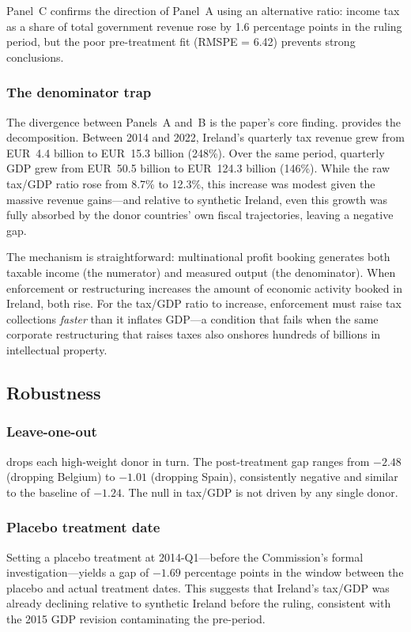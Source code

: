 \documentclass[12pt]{article}
\begin{document}
Panel~C confirms the direction of Panel~A using an alternative ratio: income tax as a share of total government revenue rose by 1.6 percentage points in the ruling period, but the poor pre-treatment fit (RMSPE = 6.42) prevents strong conclusions.

\subsubsection*{The denominator trap} The divergence between Panels~A and~B is the paper's core finding.  provides the decomposition. Between 2014 and 2022, Ireland's quarterly tax revenue grew from EUR~4.4 billion to EUR~15.3 billion (248\%). Over the same period, quarterly GDP grew from EUR~50.5 billion to EUR~124.3 billion (146\%). While the raw tax/GDP ratio rose from 8.7\% to 12.3\%, this increase was modest given the massive revenue gains---and relative to synthetic Ireland, even this growth was fully absorbed by the donor countries' own fiscal trajectories, leaving a negative gap.



The mechanism is straightforward: multinational profit booking generates both taxable income (the numerator) and measured output (the denominator). When enforcement or restructuring increases the amount of economic activity booked in Ireland, both rise. For the tax/GDP ratio to increase, enforcement must raise tax collections \textit{faster} than it inflates GDP---a condition that fails when the same corporate restructuring that raises taxes also onshores hundreds of billions in intellectual property.

\subsection{Robustness}

\subsubsection*{Leave-one-out}  drops each high-weight donor in turn. The post-treatment gap ranges from $-2.48$ (dropping Belgium) to $-1.01$ (dropping Spain), consistently negative and similar to the baseline of $-1.24$. The null in tax/GDP is not driven by any single donor.



\subsubsection*{Placebo treatment date} Setting a placebo treatment at 2014-Q1---before the Commission's formal investigation---yields a gap of $-1.69$ percentage points in the window between the placebo and actual treatment dates. This suggests that Ireland's tax/GDP was already declining relative to synthetic Ireland before the ruling, consistent with the 2015 GDP revision contaminating the pre-period.
\end{document}
